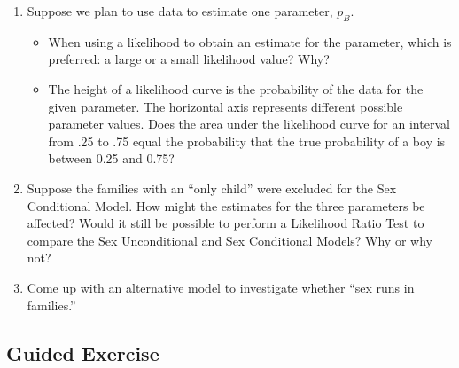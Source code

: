 \documentclass[
]{krantz}
\providecommand{\tightlist}{%
  \setlength{\itemsep}{0pt}\setlength{\parskip}{0pt}}
\begin{document}
\begin{enumerate}
\def\labelenumi{\arabic{enumi}.}
\tightlist
\item
  Suppose we plan to use data to estimate one parameter, \(p_B\).

  \begin{itemize}
  \tightlist
  \item
    When using a likelihood to obtain an estimate for the parameter, which is preferred: a large or a small likelihood value? Why?
  \item
    The height of a likelihood curve is the probability of the data for the given parameter. The horizontal axis represents different
    possible parameter values. Does the area under the likelihood curve for an interval from .25 to .75 equal the probability that the
    true probability of a boy is between 0.25 and 0.75?
  \end{itemize}
\item
  Suppose the families with an ``only child'' were excluded for the Sex Conditional Model. How might the estimates for the three parameters be affected? Would it still be possible to perform a Likelihood Ratio Test to compare the Sex Unconditional and Sex Conditional Models? Why or why not?
\item
  Come up with an alternative model to investigate whether ``sex runs in families.''
\end{enumerate}

\hypertarget{guided-exercise}{%
\subsection{Guided Exercise}\label{guided-exercise}}
\end{document}
